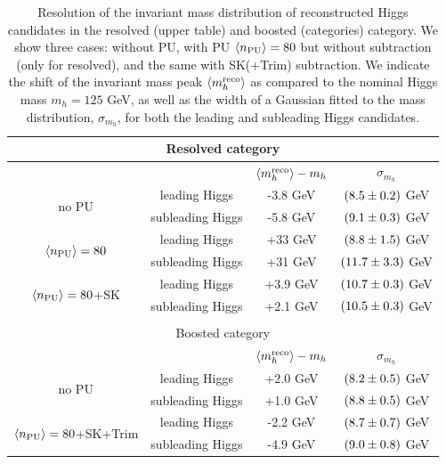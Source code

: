     \begin{table}[h]
      \centering
      \begin{tabular}{|c|c|c|c|}
        \hline
        \multicolumn{4}{|c|}{Resolved category}\\
        \hline
        \hline
        &   &   $\left\langle m_h^{\rm reco}\right\rangle-m_h$  &  $\sigma_{m_h}$  \\
              \hline
        \multirow{2}{*}{no PU}  & leading Higgs  &  -3.8 GeV   & $\left( 8.5\pm 0.2\right)$ GeV   \\
          & subleading Higgs   & -5.8 GeV  &  $\left( 9.1\pm 0.3\right)$ GeV \\
        \hline
          \multirow{2}{*}{$\left\langle n_{\rm PU}\right\rangle=80$}  & leading Higgs  &  +33 GeV   & $\left( 8.8\pm 1.5\right)$ GeV   \\
          & subleading Higgs   & +31 GeV  &  $\left( 11.7\pm 3.3\right)$ GeV \\
          \hline
            \multirow{2}{*}{$\left\langle n_{\rm PU}\right\rangle=80$+SK}  & leading Higgs  &  +3.9 GeV   & $\left( 10.7\pm 0.3\right)$ GeV   \\
          & subleading Higgs   & +2.1 GeV  &  $\left( 10.5\pm 0.3\right)$ GeV \\
            \hline
            \multicolumn{4}{c}{}\\
             \hline
        \multicolumn{4}{|c|}{Boosted category}\\
        \hline
        \hline
        &   &   $\left\langle m_h^{\rm reco}\right\rangle-m_h$  &  $\sigma_{m_h}$  \\
              \hline
        \multirow{2}{*}{no PU}  & leading Higgs  &  +2.0 GeV   & $\left( 8.2\pm 0.5\right)$ GeV   \\
          & subleading Higgs   & +1.0 GeV  &  $\left( 8.8\pm 0.5\right)$ GeV \\
        \hline
              \multirow{2}{*}{$\left\langle n_{\rm PU}\right\rangle=80$+SK+Trim}  & leading Higgs  &  -2.2 GeV   & $\left( 8.7\pm 0.7\right)$ GeV   \\
          & subleading Higgs   & -4.9 GeV  &  $\left( 9.0\pm 0.8 \right)$ GeV \\
        \hline
        \end{tabular}
      \caption{\label{tab:massresolution}
        Resolution of the invariant mass distribution of
        reconstructed Higgs candidates in the resolved (upper table)
        and boosted (categories) category.
        We show three cases: without PU, with PU $\left\langle n_{\rm PU}\right\rangle=80$
        but without subtraction (only for resolved),
        and the same with SK(+Trim) subtraction.
        We indicate the shift of the invariant
        mass peak $\left\langle m_h^{\rm reco}\right\rangle$ as compared
        to the nominal Higgs mass $m_h=125$ GeV, as well as the width
        of a Gaussian fitted to the mass distribution, $\sigma_{m_h}$,
        for both the leading and subleading Higgs candidates.
      }
    \end{table}


